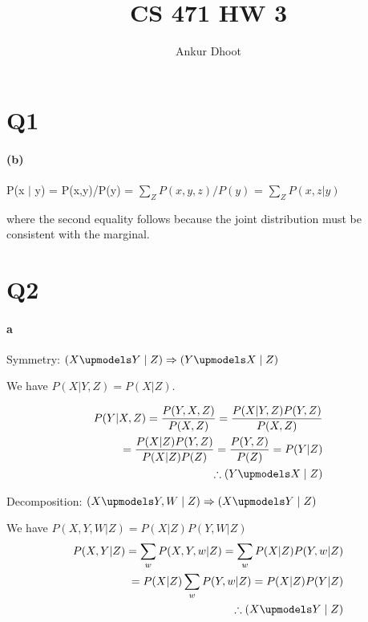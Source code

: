 \documentclass[11pt,a4paper]{article}
\begin{document}
\author{Ankur Dhoot}
\title{CS 471 HW 3}
\maketitle

\section*{Q1}

\paragraph*{(b)}
P(x $|$ y) = P(x,y)/P(y) = $\sum\limits_{Z} P(x,y,z)/P(y)$ = $\sum\limits_{Z} P(x,z | y)$  

where the second equality follows because the joint distribution must be consistent with the marginal.

\section*{Q2}
\paragraph*{a}
Symmetry: $(X \upmodels Y \mid Z) \Rightarrow (Y \upmodels X \mid Z)$

We have $P(X|Y,Z) = P(X|Z)$.

\begin{equation*}
	\begin{aligned}
	P(Y|X,Z) = \dfrac{P(Y,X,Z)}{P(X,Z)} = \dfrac{P(X|Y,Z)P(Y,Z)}{P(X,Z)} \\= \dfrac{P(X|Z)P(Y,Z)}{P(X|Z)P(Z)} = \dfrac{P(Y,Z)}{P(Z)} = P(Y|Z) \\ 
	\therefore (Y \upmodels X \mid Z)
	\end{aligned}
\end{equation*}

Decomposition: $(X \upmodels Y,W \mid Z) \Rightarrow (X \upmodels Y \mid Z)$

We have $P(X,Y,W|Z) = P(X|Z)P(Y,W|Z)$
\begin{equation*}
	\begin{aligned}
	P(X,Y|Z) = \sum\limits_{w} P(X,Y,w | Z) = \sum\limits_{w} P(X|Z)P(Y,w|Z) \\= P(X|Z)\sum\limits_{w}P(Y,w|Z) = P(X|Z)P(Y|Z) \\
	\therefore (X \upmodels Y \mid Z)
	\end{aligned}
\end{equation*}
\end{document}
